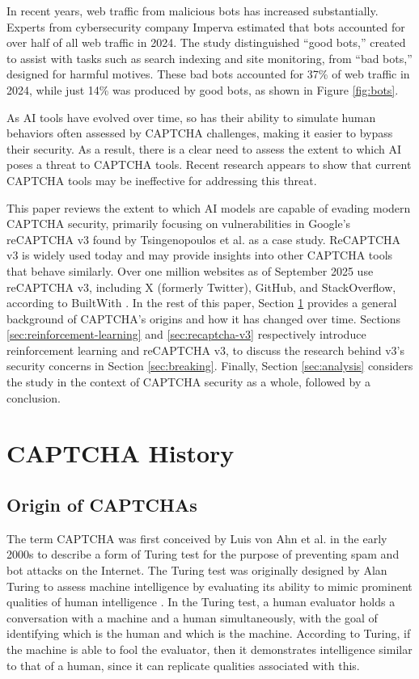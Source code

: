\documentclass[sigplan,screen,nonacm]{acmart-tagged}
\begin{document}
In recent years, web traffic from malicious bots has increased substantially. Experts from cybersecurity company Imperva estimated that bots accounted for over half of all web traffic in 2024. The study distinguished ``good bots,'' created to assist with tasks such as search indexing and site monitoring, from ``bad bots,'' designed for harmful motives. These bad bots accounted for 37\% of web traffic in 2024, while just 14\% was produced by good bots, as shown in Figure \ref{fig:bots}.

As AI tools have evolved over time, so has their ability to simulate human behaviors often assessed by CAPTCHA challenges, making it easier to bypass their security. As a result, there is a clear need to assess the extent to which AI poses a threat to CAPTCHA tools. Recent research appears to show that current CAPTCHA tools may be ineffective for addressing this threat.

This paper reviews the extent to which AI models are capable of evading modern CAPTCHA security, primarily focusing on vulnerabilities in Google's reCAPTCHA v3 found by Tsingenopoulos et al. \cite{tsingen} as a case study. ReCAPTCHA v3 is widely used today and may provide insights into other CAPTCHA tools that behave similarly. Over one million websites as of September 2025 use reCAPTCHA v3, including X (formerly Twitter), GitHub, and StackOverflow, according to BuiltWith \cite{built-with}. In the rest of this paper, Section \ref{sec:captcha-history} provides a general background of CAPTCHA's origins and how it has changed over time. Sections \ref{sec:reinforcement-learning} and \ref{sec:recaptcha-v3} respectively introduce reinforcement learning and reCAPTCHA v3, to discuss the research behind v3's security concerns in Section \ref{sec:breaking}. Finally, Section \ref{sec:analysis} considers the study in the context of CAPTCHA security as a whole, followed by a conclusion.

\section{CAPTCHA History}
\label{sec:captcha-history}

\subsection{Origin of CAPTCHAs}
\label{sec:origin-of-captchas}

The term CAPTCHA was first conceived by Luis von Ahn et al. \cite{von-ahn} in the early 2000s to describe a form of Turing test for the purpose of preventing spam and bot attacks on the Internet. The Turing test was originally designed by Alan Turing to assess machine intelligence by evaluating its ability to mimic prominent qualities of human intelligence \cite{turing}. In the Turing test, a human evaluator holds a conversation with a machine and a human simultaneously, with the goal of identifying which is the human and which is the machine. According to Turing, if the machine is able to fool the evaluator, then it demonstrates intelligence similar to that of a human, since it can replicate qualities associated with this.
\end{document}
